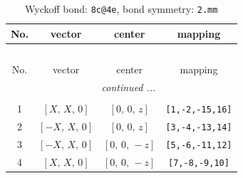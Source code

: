 \documentclass[fleqn,8pt]{jsarticle}
\begin{document}
\renewcommand{\arraystretch}{1.2}
\begin{longtable}{cccc}
\caption{Wyckoff bond: {\tt 8c@4e}, bond symmetry: {\tt 2.mm}}
 \\
 \hline \hline
No. & vector & center & mapping \\ \hline \endfirsthead

\multicolumn{3}{l}{\tablename\ \thetable{}} \\
 \hline \hline
No. & vector & center & mapping \\ \hline \endhead

 \hline \hline
\multicolumn{3}{r}{\footnotesize\it continued ...} \\ \endfoot

 \hline \hline
\multicolumn{3}{r}{} \\ \endlastfoot

1 & $\left[ X,\, X,\, 0 \right]$ & $\left[ 0,\, 0,\, z \right]$ & {\tt [1,-2,-15,16]} \\ \hline
2 & $\left[ - X,\, X,\, 0 \right]$ & $\left[ 0,\, 0,\, z \right]$ & {\tt [3,-4,-13,14]} \\ \hline
3 & $\left[ - X,\, X,\, 0 \right]$ & $\left[ 0,\, 0,\, - z \right]$ & {\tt [5,-6,-11,12]} \\ \hline
4 & $\left[ X,\, X,\, 0 \right]$ & $\left[ 0,\, 0,\, - z \right]$ & {\tt [7,-8,-9,10]} \\
\end{longtable}
\renewcommand{\arraystretch}{1.2}
\end{document}
